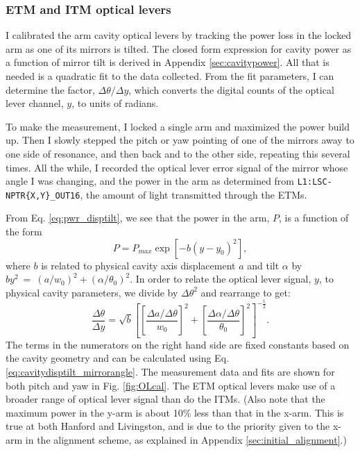 \subsubsection{ETM and ITM optical levers} 
I calibrated the arm cavity optical levers by tracking the power loss
in the locked arm as one of its mirrors is tilted. The closed form
expression for cavity power as a function of mirror tilt is derived in
Appendix \ref{sec:cavitypower}. All that is needed is a quadratic fit
to the data collected. From the fit parameters, I can determine the
factor, $\Delta \theta / \Delta y$, which converts the digital counts
of the optical lever channel, $y$, to units of radians.

To make the measurement, I locked a single arm and maximized the power
build up. Then I slowly stepped the pitch or yaw pointing of one of
the mirrors away to one side of resonance, and then back and to the
other side, repeating this several times. All the while, I recorded
the optical lever error signal of the mirror whose angle I was
changing, and the power in the arm as determined from
\texttt{L1:LSC-NPTR\{X,Y\}\_OUT16}, the amount of light transmitted
through the ETMs.

From Eq. \ref{eq:pwr_disptilt}, we see that the power in the arm, $P$,
is a function of the form 
\begin{equation}
P = P_{max} \exp{[-b (y-y_0)^2]},
\label{eq:OLcalfit}
\end{equation}
where $b$ is related to physical cavity axis displacement $a$ and tilt
$\alpha$ by $by^2~=~(a/w_0)^2+(\alpha/\theta_0)^2$. In order to relate
the optical lever signal, $y$, to physical cavity parameters, we
divide by $\Delta{\theta}^2$ and rearrange to get:
\begin{equation}
\frac{\Delta \theta}{\Delta y} = \sqrt{b} \left[
  \left[\frac{\Delta a/\Delta\theta}{w_0}\right]^2 +
  \left[\frac{\Delta\alpha/\Delta\theta}{\theta_0}\right]^2
\right]^{-\frac{1}{2}} .
\end{equation}
The terms in the numerators on the right hand side are fixed constants
based on the cavity geometry and can be calculated using
Eq. \ref{eq:cavitydisptilt_mirrorangle}. The measurement data and fits
are shown for both pitch and yaw in Fig. \ref{fig:OLcal}. The ETM
optical levers make use of a broader range of optical lever signal
than do the ITMs. (Also note that the maximum power in the y-arm is about
10\% less than that in the x-arm. This is true at both Hanford and
Livingston, and is due to the priority given to the x-arm in the
alignment scheme, as explained in Appendix
\ref{sec:initial_alignment}.)

